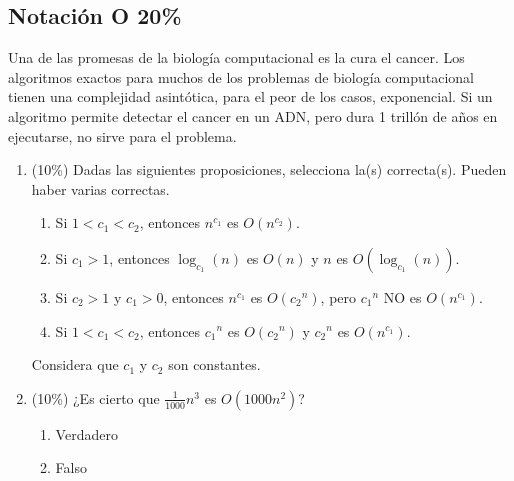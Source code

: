 \documentclass[10 pt]{article}
\begin{document}
\begin{multicols}{2}
\section{Notación O 20\%}
Una de las promesas de la biología computacional es la cura el cancer. Los algoritmos exactos para muchos
de los problemas de biología computacional tienen una complejidad asintótica, para el peor de los casos, exponencial. 
Si un algoritmo permite detectar el cancer en un ADN, pero dura 1 trillón de años en ejecutarse, no sirve para el problema. 
\begin{enumerate}[label=\Alph*]
\item (10\%) Dadas las siguientes proposiciones, selecciona la(s) correcta(s). Pueden haber varias correctas.
\begin{enumerate}
\item Si $1<c_1<c_2$, entonces $n^{c_1}$ es $O(n^{c_2})$.
\item Si $c_1>1$, entonces $\log_{c_1}(n)$ es $O(n)$ y $n$ es $O(\log_{c_1}(n))$.
\item Si $c_2>1$ y $c_1>0$, entonces $n^{c_1}$ es $O({c_2}^n)$, pero ${c_1}^n$ NO es $O(n^{c_1})$.
\item Si $1<c_1< c_2$, entonces ${c_1}^n$ es $O({c_2}^n)$ y ${c_2}^n$ es $O(n^{c_1})$.
\end{enumerate}
 Considera que $c_1$ y $c_2$ son constantes.

\item (10\%) ¿Es cierto que $\frac{1}{1000}n^3$ es $O(1000n^2)$?
\begin{enumerate}
\item Verdadero
\item Falso
\end{enumerate}
\end{enumerate}



\end{multicols}
\end{document}
